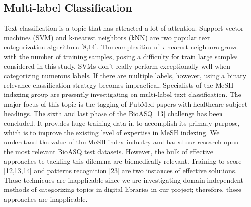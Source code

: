 \documentclass[a4paper]{article}
\begin{document}
\subsection{Multi-label Classification}
Text classification is a topic that has attracted a lot of attention. Support vector machines (SVM) and k-nearest neighbors (kNN) are two popular text categorization algorithms [8,14]. The complexities of k-nearest neighbors grows with the number of training samples, posing a difficulty for train large samples considered in this study. SVMs don't really perform exceptionally well when categorizing numerous labels. If there are multiple labels, however, using a binary relevance classification strategy becomes impractical. Specialists of the MeSH indexing group are presently investigating on multi-label text classification. The major focus of this topic is the tagging of PubMed papers with healthcare subject headings. The sixth and last phase of the BioASQ [13] challenge has been concluded. It provides huge training data in to accomplish its primary purpose, which is to improve the existing level of expertise in MeSH indexing. We understand the value of the MeSH index industry and based our research upon the most relevant BioASQ test datasets. However, the bulk of effective approaches to tackling this dilemma are biomedically relevant. Training to score [12,13,14] and patterns recognition [23] are two instances of effective solutions. These techniques are inapplicable since we are investigating domain-independent methods of categorizing topics in digital libraries in our project; therefore, these approaches are inapplicable.
\end{document}
